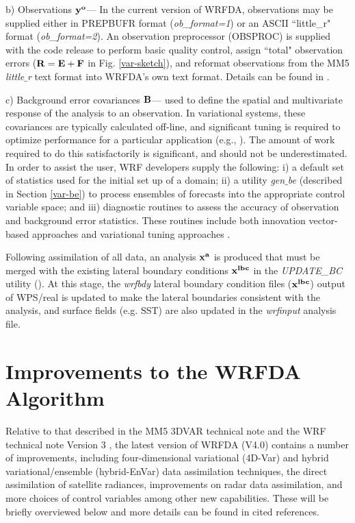 b) Observations ${\bf y^{o}}$--- In the current version of WRFDA, observations may be 
supplied either in PREPBUFR format ({\it ob\_format=1}) or an ASCII ``little\_r" format
({\it ob\_format=2}). An observation preprocessor (OBSPROC) 
is supplied with the code release to perform basic quality control, assign ``total" 
observation errors (${\bf R = E+F}$ in Fig. \ref{var-sketch}), and reformat observations from the MM5 {\it little$\_$r} text 
format into WRFDA's own text format. Details can be found in \citet{barker03, barker04}.

\vspace{0.5cm}

c) Background error covariances ${\bf B}$--- used to define the spatial
and multivariate response of the analysis to an observation. In
variational systems, these covariances are typically calculated
off-line, and significant tuning is required to optimize performance
for a particular application (e.g., \citet{ingleby01, wu02}). The
amount of work required to do this satisfactorily is significant, and
should not be underestimated. In order to assist the user, WRF
developers supply the following: i) a default set of statistics used
for the initial set up of a domain; ii) a utility {\it gen$\_$be}
(described in Section
\ref{var-be}) to process ensembles of forecasts into the appropriate control variable 
space; and iii) diagnostic routines to assess the accuracy of
observation and background error statistics. These routines include
both innovation vector-based approaches \citep{hollingsworth86} and
variational tuning approaches \citep{desroziers01}.

Following assimilation of all data, an analysis ${\bf x^{a}}$ is produced that must be 
merged with the existing lateral boundary conditions ${\bf x^{lbc}}$ in the {\it UPDATE\_BC} 
utility (\citet{barker03}). At this stage, the {\it wrfbdy} lateral boundary condition 
files (${\bf x^{lbc}}$) output of WPS/real is updated to make the lateral boundaries consistent 
with the analysis, and surface fields (e.g. SST) are also updated in the {\it wrfinput} analysis file.

\section{Improvements to the WRFDA Algorithm}
\label{var-upgrade}

Relative to that described in the MM5 3DVAR technical note \citep{barker03} and the WRF technical note Version 3 
\citep{skamarock08}, the latest version of WRFDA (V4.0) contains a number of improvements,
including four-dimensional variational (4D-Var) and hybrid variational/ensemble (hybrid-EnVar) data assimilation 
techniques, the direct assimilation of satellite radiances, improvements on radar data assimilation, and more choices
of control variables among other new capabilities. These will be briefly overviewed below and more details can be
found in cited references.

